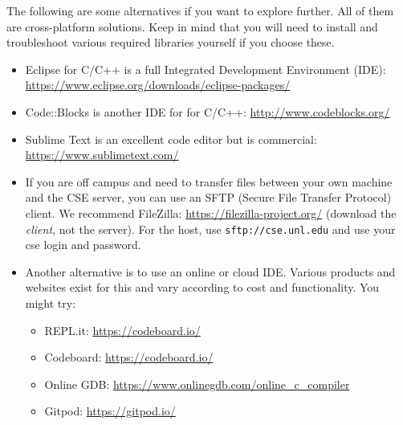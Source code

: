 \documentclass[12pt]{scrartcl}
\begin{document}
The following are some alternatives if you want to explore further.
All of them are cross-platform solutions.  Keep in mind that you will
need to install and troubleshoot various required libraries yourself if
you choose these.
\begin{itemize} 
  \item Eclipse for C/C++ is a full Integrated Development Environment (IDE):
  \url{https://www.eclipse.org/downloads/eclipse-packages/}
  \item Code::Blocks is another IDE for for C/C++: \url{http://www.codeblocks.org/}
  \item Sublime Text is an excellent code editor but is commercial: \url{https://www.sublimetext.com/}
  \item If you are off campus and need to transfer files between your 
  own machine and the CSE server, you can use an SFTP (Secure File Transfer
  Protocol) client.  We recommend FileZilla: \url{https://filezilla-project.org/}
  (download the \emph{client}, not the server).  For the host, use 
  \texttt{sftp://cse.unl.edu} and use your cse login and password.
  \item Another alternative is to use an online or cloud IDE.  Various products
  and websites exist for this and vary according to cost and functionality.
  You might try: 
  \begin{itemize}
    \item REPL.it: \url{https://codeboard.io/}
    \item Codeboard: \url{https://codeboard.io/}
    \item Online GDB: \url{https://www.onlinegdb.com/online_c_compiler}
    \item Gitpod: \url{https://gitpod.io/}
  \end{itemize}
\end{itemize}


  
\end{document}
